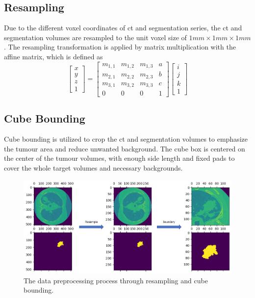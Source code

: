\documentclass[11pt,times,oneside,openright]{eeereport}
\begin{document}
\subsection{Resampling}
Due to the different voxel coordinates of \acrshort{ct} and segmentation series, the \acrshort{ct} and segmentation volumes are resampled to the unit voxel size of \(1mm\times1mm\times1mm\). The resampling transformation is applied by matrix multiplication with the affine matrix, which is defined as
\begin{equation}
\left[\begin{array}{c}
x \\
y \\
z \\
1
\end{array}\right]=\left[\begin{array}{cccc}
m_{1,1} & m_{1,2} & m_{1,3} & a \\
m_{2,1} & m_{2,2} & m_{2,3} & b \\
m_{3,1} & m_{3,2} & m_{3,3} & c \\
0 & 0 & 0 & 1
\end{array}\right]\left[\begin{array}{c}
i \\
j \\
k \\
1
\end{array}\right]
\end{equation}
\subsection{Cube Bounding}
Cube bounding is utilized to crop the \acrshort{ct} and segmentation volumes to emphasize the tumour area and reduce unwanted background. The cube box is centered on the center of the tumour volumes, with enough side length and fixed pads to cover the whole target volumes and necessary backgrounds.
\begin{figure}[h]
    \centering
    \includegraphics[width=\textwidth]{fig/preprocess_path.png}
    \caption{The data preprocessing process through resampling and cube bounding.}
    \label{fig:preprocess_path}
\end{figure}
\end{document}
